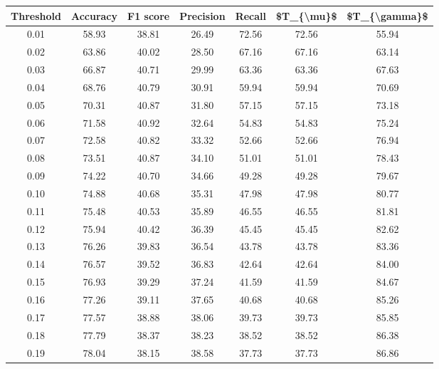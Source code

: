 \begin{tabular}{|c|c|c|c|c|c|c|}
\hline
 Threshold &  Accuracy &  F1 score &  Precision &  Recall &  \$T\_\{\textbackslash mu\}\$ &  \$T\_\{\textbackslash gamma\}\$ \\
\hline
      0.01 &     58.93 &     38.81 &      26.49 &   72.56 &      72.56 &         55.94 \\
      0.02 &     63.86 &     40.02 &      28.50 &   67.16 &      67.16 &         63.14 \\
      0.03 &     66.87 &     40.71 &      29.99 &   63.36 &      63.36 &         67.63 \\
      0.04 &     68.76 &     40.79 &      30.91 &   59.94 &      59.94 &         70.69 \\
      0.05 &     70.31 &     40.87 &      31.80 &   57.15 &      57.15 &         73.18 \\
      0.06 &     71.58 &     40.92 &      32.64 &   54.83 &      54.83 &         75.24 \\
      0.07 &     72.58 &     40.82 &      33.32 &   52.66 &      52.66 &         76.94 \\
      0.08 &     73.51 &     40.87 &      34.10 &   51.01 &      51.01 &         78.43 \\
      0.09 &     74.22 &     40.70 &      34.66 &   49.28 &      49.28 &         79.67 \\
      0.10 &     74.88 &     40.68 &      35.31 &   47.98 &      47.98 &         80.77 \\
      0.11 &     75.48 &     40.53 &      35.89 &   46.55 &      46.55 &         81.81 \\
      0.12 &     75.94 &     40.42 &      36.39 &   45.45 &      45.45 &         82.62 \\
      0.13 &     76.26 &     39.83 &      36.54 &   43.78 &      43.78 &         83.36 \\
      0.14 &     76.57 &     39.52 &      36.83 &   42.64 &      42.64 &         84.00 \\
      0.15 &     76.93 &     39.29 &      37.24 &   41.59 &      41.59 &         84.67 \\
      0.16 &     77.26 &     39.11 &      37.65 &   40.68 &      40.68 &         85.26 \\
      0.17 &     77.57 &     38.88 &      38.06 &   39.73 &      39.73 &         85.85 \\
      0.18 &     77.79 &     38.37 &      38.23 &   38.52 &      38.52 &         86.38 \\
      0.19 &     78.04 &     38.15 &      38.58 &   37.73 &      37.73 &         86.86 \\

\end{tabular}
